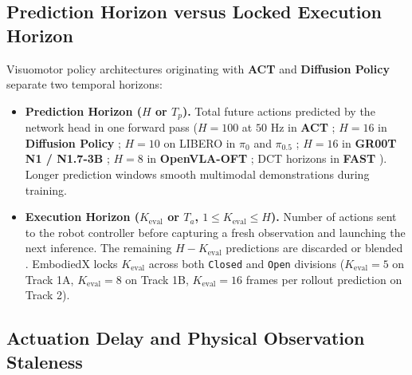 \documentclass[10pt,letterpaper]{article}
\begin{document}
\subsection{Prediction Horizon versus Locked Execution Horizon}

Visuomotor policy architectures originating with \textbf{ACT} \cite{Zhao2023learning} and \textbf{Diffusion Policy} \cite{Chi2024diffusion} separate two temporal horizons:
\begin{itemize}
    \item \textbf{Prediction Horizon ($H$ or $T_p$).} Total future actions predicted by the network head in one forward pass ($H = 100$ at $50\text{ Hz}$ in \textbf{ACT} \cite{Zhao2023learning}; $H = 16$ in \textbf{Diffusion Policy} \cite{Chi2024diffusion}; $H = 10$ on LIBERO in \textbf{$\pi_0$} \cite{Black2024pi0} and \textbf{$\pi_{0.5}$} \cite{PhysicalIntelligence2025pi05}; $H = 16$ in \textbf{GR00T N1 / N1.7-3B} \cite{Bjorck2025gr00t}; $H = 8$ in \textbf{OpenVLA-OFT} \cite{Kim2025finetuning}; DCT horizons in \textbf{FAST} \cite{Pertsch2025fast}). Longer prediction windows smooth multimodal demonstrations during training.
    \item \textbf{Execution Horizon ($K_{\text{eval}}$ or $T_a$, $1 \le K_{\text{eval}} \le H$).} Number of actions sent to the robot controller before capturing a fresh observation and launching the next inference. The remaining $H - K_{\text{eval}}$ predictions are discarded or blended \cite{Zhao2023learning,Black2025realtime}. EmbodiedX locks $K_{\text{eval}}$ across both \texttt{Closed} and \texttt{Open} divisions ($K_{\text{eval}} = 5$ on Track 1A, $K_{\text{eval}} = 8$ on Track 1B, $K_{\text{eval}} = 16$ frames per rollout prediction on Track 2).
\end{itemize}

\noindent{}

\subsection{Actuation Delay and Physical Observation Staleness}
\end{document}
